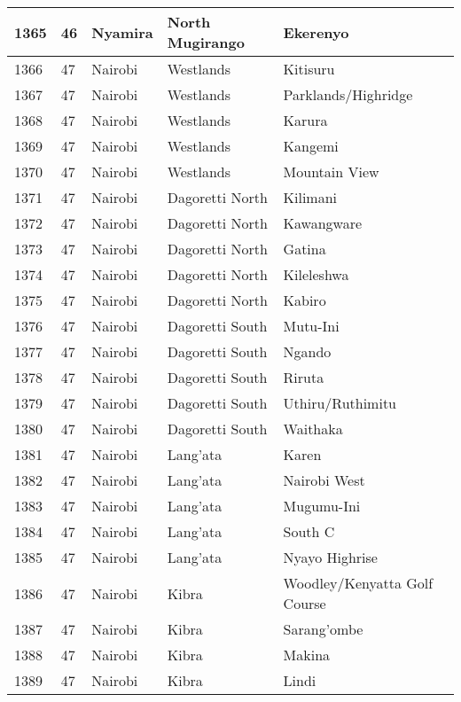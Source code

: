 \begin{table}[!ht]
\begin{tabular}{|l|l|l|l|l|}
        1365 & 46 & Nyamira & North Mugirango & Ekerenyo \\ \hline
        1366 & 47 & Nairobi & Westlands & Kitisuru \\ \hline
        1367 & 47 & Nairobi & Westlands & Parklands/Highridge \\ \hline
        1368 & 47 & Nairobi & Westlands & Karura \\ \hline
        1369 & 47 & Nairobi & Westlands & Kangemi \\ \hline
        1370 & 47 & Nairobi & Westlands & Mountain View \\ \hline
        1371 & 47 & Nairobi & Dagoretti North & Kilimani \\ \hline
        1372 & 47 & Nairobi & Dagoretti North & Kawangware \\ \hline
        1373 & 47 & Nairobi & Dagoretti North & Gatina \\ \hline
        1374 & 47 & Nairobi & Dagoretti North & Kileleshwa \\ \hline
        1375 & 47 & Nairobi & Dagoretti North & Kabiro \\ \hline
        1376 & 47 & Nairobi & Dagoretti South & Mutu-Ini \\ \hline
        1377 & 47 & Nairobi & Dagoretti South & Ngando \\ \hline
        1378 & 47 & Nairobi & Dagoretti South & Riruta \\ \hline
        1379 & 47 & Nairobi & Dagoretti South & Uthiru/Ruthimitu \\ \hline
        1380 & 47 & Nairobi & Dagoretti South & Waithaka \\ \hline
        1381 & 47 & Nairobi & Lang’ata & Karen \\ \hline
        1382 & 47 & Nairobi & Lang’ata & Nairobi West \\ \hline
        1383 & 47 & Nairobi & Lang’ata & Mugumu-Ini \\ \hline
        1384 & 47 & Nairobi & Lang’ata & South C \\ \hline
        1385 & 47 & Nairobi & Lang’ata & Nyayo Highrise \\ \hline
        1386 & 47 & Nairobi & Kibra & Woodley/Kenyatta Golf Course \\ \hline
        1387 & 47 & Nairobi & Kibra & Sarang’ombe \\ \hline
        1388 & 47 & Nairobi & Kibra & Makina \\ \hline
        1389 & 47 & Nairobi & Kibra & Lindi \\ \hline

\end{tabular}
\end{table}
